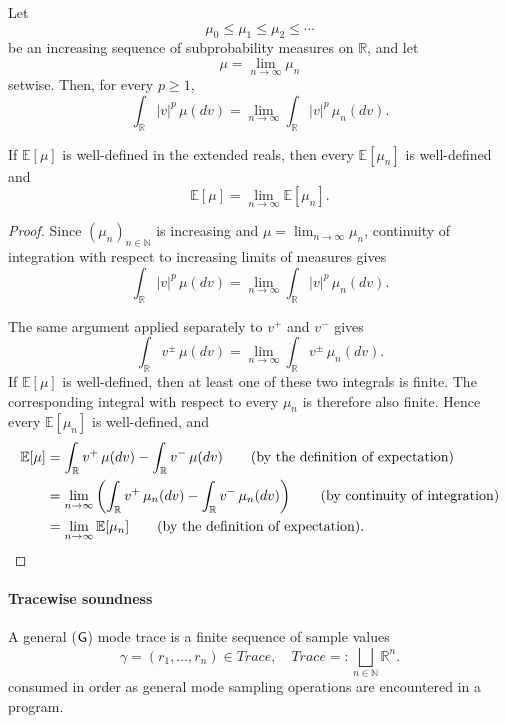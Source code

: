 \begin{lemma}
  \label{lem:extended-expectation-increasing-limits}
  Let
  \[
    \mu_0\leq\mu_1\leq\mu_2\leq\cdots
  \]
  be an increasing sequence of subprobability measures on $\mathbb R$,
  and let
  \[
    \mu=\lim_{n\to\infty}\mu_n
  \]
  setwise. Then, for every $p\geq1$,
  \[
    \int_{\mathbb R}|v|^p\,\mu(dv)
    =
    \lim_{n\to\infty}
    \int_{\mathbb R}|v|^p\,\mu_n(dv).
  \]

  If $\mathbb E[\mu]$ is well-defined in the extended reals, then
  every $\mathbb E[\mu_n]$ is well-defined and
  \[
    \mathbb E[\mu]
    =
    \lim_{n\to\infty}\mathbb E[\mu_n].
  \]
\end{lemma}

\begin{proof}
  Since $(\mu_n)_{n\in\mathbb N}$ is increasing and
  $\mu=\lim_{n\to\infty}\mu_n$, continuity of integration with
  respect to increasing limits of measures gives
  \[
    \int_{\mathbb R}|v|^p\,\mu(dv)
    =
    \lim_{n\to\infty}
    \int_{\mathbb R}|v|^p\,\mu_n(dv).
  \]

  The same argument applied separately to $v^+$ and $v^-$ gives
  \[
    \int_{\mathbb R}v^\pm\,\mu(dv)
    =
    \lim_{n\to\infty}
    \int_{\mathbb R}v^\pm\,\mu_n(dv).
  \]
  If $\mathbb E[\mu]$ is well-defined, then at least one of these two
  integrals is finite. The corresponding integral with respect to
  every $\mu_n$ is therefore also finite. Hence every
  $\mathbb E[\mu_n]$ is well-defined, and
  \begin{align}
    \mathbb E[\mu]
    &=
    \int_{\mathbb R}v^+\,\mu(dv)
    -
    \int_{\mathbb R}v^-\,\mu(dv)
    \tag{\text{by the definition of expectation}}
    \\
    &=
    \lim_{n\to\infty}
    \left(
      \int_{\mathbb R}v^+\,\mu_n(dv)
      -
      \int_{\mathbb R}v^-\,\mu_n(dv)
    \right)
    \tag{\text{by continuity of integration}}
    \\
    &=
    \lim_{n\to\infty}\mathbb E[\mu_n]
    \tag{\text{by the definition of expectation}}.
  \end{align}
\end{proof}



\paragraph{Tracewise soundness}

\begin{definition}
  A general ($\mathsf{G}$) mode trace is a finite sequence of sample values
  \[
    \gamma=(r_1,\ldots,r_n) \in Trace,
    \quad
    Trace =: \bigsqcup_{n\in\mathbb N}\mathbb R^n.
  \]
  consumed in order as general mode sampling operations are encountered in a program.
\end{definition}

